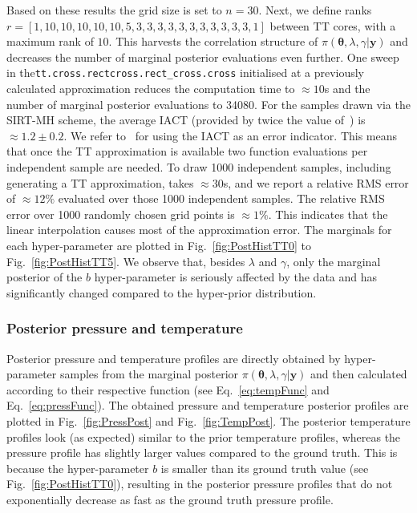 Based on these results the grid size is set to $n = 30$.
Next, we define ranks $r =[ 1,  10,  10, 10, 10, 10, 5, 3, 3, 3, 3, 3, 3 , 3, 3, 3, 3, 3, 1]$ between TT cores, with a maximum rank of $10$.
This harvests the correlation structure of $\pi(\bm{\theta},\lambda,\gamma  | \bm{y})$ and decreases the number of marginal posterior evaluations even further.
One sweep in the\linebreak \texttt{tt.cross.rectcross.rect\_cross.cross} initialised at a previously calculated approximation reduces the computation time to $\approx 10$s and the number of marginal posterior evaluations to 34080.
For the samples drawn via the SIRT-MH scheme, the average IACT (provided by twice the value of~\cite{wolff2004monte, drikHesse}) is $\approx 1.2 \pm 0.2$.
We refer to~\cite{dolgov2020approximation} for using the IACT as an error indicator.
This means that once the TT approximation is available two function evaluations per independent sample are needed.
To draw 1000 independent samples, including generating a TT approximation, takes $\approx30$s, and we report a relative RMS error of $\approx 12 \%$ evaluated over those 1000 independent samples.
The relative RMS error over 1000 randomly chosen grid points is $\approx 1\%$.
This indicates that the linear interpolation causes most of the approximation error.
The marginals for each hyper-parameter are plotted in Fig.~\ref{fig:PostHistTT0} to Fig.~\ref{fig:PostHistTT5}.
We observe that, besides $\lambda$ and $\gamma$, only the marginal posterior of the $b$ hyper-parameter is seriously affected by the data and has significantly changed compared to the hyper-prior distribution.
\clearpage

\subsubsection{Posterior pressure and temperature}
Posterior pressure and temperature profiles are directly obtained by hyper-parameter samples from the marginal posterior $\pi(\bm{\theta},\lambda,\gamma  | \bm{y})$ and then calculated according to their respective function (see Eq.~\ref{eq:tempFunc} and Eq.~\ref{eq:pressFunc}).
The obtained pressure and temperature posterior profiles are plotted in Fig.~\ref{fig:PressPost} and Fig.~\ref{fig:TempPost}.
The posterior temperature profiles look (as expected) similar to the prior temperature profiles, whereas the pressure profile has slightly larger values compared to the ground truth.
This is because the hyper-parameter $b$ is smaller than its ground truth value (see Fig.~\ref{fig:PostHistTT0}), resulting in the posterior pressure profiles that do not exponentially decrease as fast as the ground truth pressure profile.

